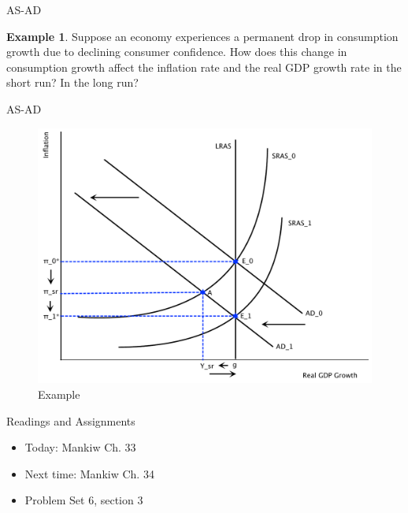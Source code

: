 \documentclass[xcolor={dvipsnames},pdf, hyperref={colorlinks=true, citecolor=ForestGreen, linkcolor=BlueViolet, urlcolor=Magenta}]{beamer}
\theoremstyle{definition}
\newtheorem{exmp}{Example}[section]
\begin{document}
\begin{frame}{AS-AD}
\begin{exmp}
	Suppose an economy experiences a permanent drop in consumption growth due to declining consumer confidence. How does this change in consumption growth affect the inflation rate and the real GDP growth rate in the short run? In the long run?
\end{exmp}
\end{frame}

\begin{frame}[b]{AS-AD}


\begin{figure}[H]
	\centering
	\includegraphics[scale=.40]{plot101.pdf}
	\caption{Example}
\end{figure}

\end{frame}

\begin{frame}{Readings and Assignments}
\begin{itemize}
	\item Today: Mankiw Ch. 33
	\item Next time: Mankiw Ch. 34
	\item Problem Set 6, section 3
\end{itemize}
\end{frame}
\end{document}
